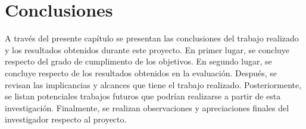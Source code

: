 \chapter{Conclusiones}
\label{chp:conclusiones}
A través del presente capítulo se presentan las conclusiones del trabajo realizado y los resultados obtenidos durante este proyecto. En primer lugar, se concluye respecto del grado de cumplimento de los objetivos. En segundo lugar, se concluye respecto de los resultados obtenidos en la evaluación. Después, se revisan las implicancias y alcances que tiene el trabajo realizado. Posteriormente, se listan potenciales trabajos futuros que podrían realizarse a partir de esta investigación. Finalmente, se realizan observaciones y apreciaciones finales del investigador respecto al proyecto. 


%
%
%